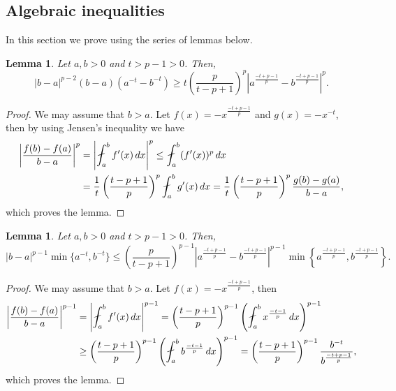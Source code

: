 \documentclass[11pt]{amsart}
\theoremstyle{plain}
\newtheorem{lemma}[theorem]{Lemma}
\theoremstyle{definition}
\numberwithin{equation}{section}
\renewcommand{\d}{\textnormal{d}}
\begin{document}
\begin{appendix}

\section{Algebraic inequalities} \label{sec:ineq}

In this section we prove  using the series of lemmas below.

\begin{lemma} \label{lem:ineq1}
Let $a, b > 0$ and $t > p-1 > 0$. Then,
\begin{equation*}
|b-a|^{p-2}(b-a)(a^{-t} - b^{-t}) \geq t\left( \frac{p}{t-p+1} \right)^p \left| a^{\frac{-t+p-1}{p}} - b^{\frac{-t+p-1}{p}} \right|^p.
\end{equation*}
\end{lemma}

\begin{proof}
We may assume that $b > a$. Let $f(x) = -x^{\frac{-t+p-1}{p}}$ and $g(x) = -x^{-t}$, then by using Jensen's inequality we have
\begin{equation*}
\begin{split}
\left| \frac{f(b)-f(a)}{b-a} \right|^p
&= \left| \fint_a^b f'(x) \,\d x \right|^p \leq \fint_a^b (f'(x))^p \,\d x \\
&= \frac{1}{t} \left( \frac{t-p+1}{p} \right)^p \fint_a^b g'(x) \,\d x = \frac{1}{t} \left( \frac{t-p+1}{p} \right)^p \frac{g(b)-g(a)}{b-a},
\end{split}
\end{equation*}
which proves the lemma.
\end{proof}

\begin{lemma} \label{lem:ineq2}
Let $a, b > 0$ and $t > p-1 > 0$. Then,
\begin{equation*}
|b-a|^{p-1} \min\lbrace a^{-t}, b^{-t} \rbrace \leq \left( \frac{p}{t-p+1} \right)^{p-1} \left| a^{\frac{-t+p-1}{p}} - b^{\frac{-t+p-1}{p}} \right|^{p-1} \min\left\lbrace a^{\frac{-t+p-1}{p}}, b^{\frac{-t+p-1}{p}} \right\rbrace.
\end{equation*}
\end{lemma}

\begin{proof}
We may assume that $b > a$. Let $f(x) = -x^{\frac{-t+p-1}{p}}$, then
\begin{equation*}
\begin{split}
\left| \frac{f(b)-f(a)}{b-a} \right|^{p-1}
&= \left| \fint_a^b f'(x) \,\d x \right|^{p-1} = \left( \frac{t-p+1}{p} \right)^{p-1} \left( \fint_a^b x^{\frac{-t-1}{p}} \,\d x \right)^{p-1} \\
&\geq \left( \frac{t-p+1}{p} \right)^{p-1} \left( \fint_a^b b^{\frac{-t-1}{p}} \,\d x \right)^{p-1} = \left( \frac{t-p+1}{p} \right)^{p-1} \frac{b^{-t}}{b^{\frac{-t+p-1}{p}}},
\end{split}
\end{equation*}
which proves the lemma.
\end{proof}



\end{appendix}
\end{document}
